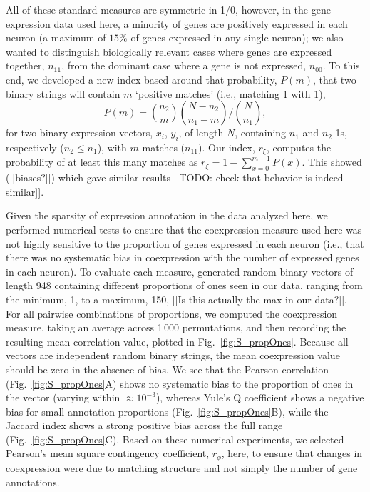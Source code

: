 \documentclass[10pt,letterpaper]{article}
\begin{document}
All of these standard measures are symmetric in 1/0, however, in the gene expression data used here, a minority of genes are positively expressed in each neuron (a maximum of $15\%$ of genes expressed in any single neuron); we also wanted to distinguish biologically relevant cases where genes are expressed together, $n_{11}$, from the dominant case where a gene is not expressed, $n_{00}$.
To this end, we developed a new index based around that probability, $P(m)$, that two binary strings will contain $m$ `positive matches' (i.e., matching 1 with 1),
\begin{equation}
    P(m) = \binom{n_2}{m} \binom{N-n_2}{n_1-m} / \binom{N}{n_1},
\end{equation}
for two binary expression vectors, $x_i$, $y_i$, of length $N$, containing $n_1$ and $n_2$ 1s, respectively ($n_2 \leq n_1$), with $m$ matches ($n_{11}$).
Our index, $r_\xi$, computes the probability of at least this many matches as $r_\xi = 1 - \sum_{x=0}^{m-1} P(x)$.
This showed ([[biases?]]) which gave similar results [[TODO: check that behavior is indeed similar]].

Given the sparsity of expression annotation in the data analyzed here, we performed numerical tests to ensure that the coexpression measure used here was not highly sensitive to the proportion of genes expressed in each neuron (i.e., that there was no systematic bias in coexpression with the number of expressed genes in each neuron).
To evaluate each measure, generated random binary vectors of length 948 containing different proportions of ones seen in our data, ranging from the minimum, 1, to a maximum, 150, [[Is this actually the max in our data?]].
For all pairwise combinations of proportions, we computed the coexpression measure, taking an average across 1\,000 permutations, and then recording the resulting mean correlation value, plotted in Fig.~\ref{fig:S_propOnes}.
Because all vectors are independent random binary strings, the mean coexpression value should be zero in the absence of bias.
We see that the Pearson correlation (Fig.~\ref{fig:S_propOnes}A) shows no systematic bias to the proportion of ones in the vector (varying within $\approx 10^{-3}$), whereas Yule's Q coefficient shows a negative bias for small annotation proportions (Fig.~\ref{fig:S_propOnes}B), while the Jaccard index shows a strong positive bias across the full range (Fig.~\ref{fig:S_propOnes}C).
Based on these numerical experiments, we selected Pearson's mean square contingency coefficient, $r_\phi$, here, to ensure that changes in coexpression were due to matching structure and not simply the number of gene annotations.
\end{document}
